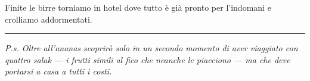 Finite le birre torniamo in hotel dove tutto è già pronto per l'indomani e crolliamo addormentati.

\begin{center}
    \noindent\rule{0.6\textwidth}{0.4pt}
\end{center}

\textit{P.s. Oltre all'ananas scoprirò solo in un secondo momento di aver viaggiato con quattro salak — i frutti simili al fico che neanche le piacciono — ma che deve portarsi a casa a tutti i costi.}


\pagestyle{empty} %



\pagestyle{fancy} %